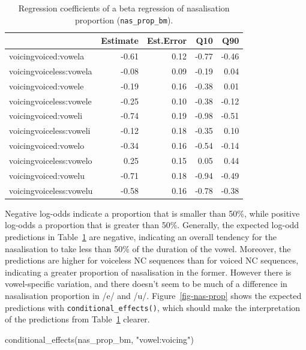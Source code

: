 \documentclass[
  authoryear,
  preprint,
  3p]{elsarticle}
\newenvironment{Shaded}{\begin{snugshade}}{\end{snugshade}}
\newcommand{\AttributeTok}[1]{\textcolor[rgb]{0.40,0.45,0.13}{#1}}
\newcommand{\ConstantTok}[1]{\textcolor[rgb]{0.56,0.35,0.01}{#1}}
\newcommand{\DecValTok}[1]{\textcolor[rgb]{0.68,0.00,0.00}{#1}}
\newcommand{\FunctionTok}[1]{\textcolor[rgb]{0.28,0.35,0.67}{#1}}
\newcommand{\NormalTok}[1]{\textcolor[rgb]{0.00,0.23,0.31}{#1}}
\newcommand{\OtherTok}[1]{\textcolor[rgb]{0.00,0.23,0.31}{#1}}
\newcommand{\SpecialCharTok}[1]{\textcolor[rgb]{0.37,0.37,0.37}{#1}}
\newcommand{\StringTok}[1]{\textcolor[rgb]{0.13,0.47,0.30}{#1}}
\providecommand{\DIFadd}[1]{{\protect\color{blue}\uwave{#1}}} %
\providecommand{\DIFaddbegin}{} %
\providecommand{\DIFaddend}{} %
\newcommand{\DIFaddincludegraphics}[2][]{{\color{blue}\fbox{\DIFOincludegraphics[#1]{#2}}}} %
\DeclareRobustCommand{\DIFaddbegin}{\DIFOaddbegin \let\includegraphics\DIFaddincludegraphics} %
\DeclareRobustCommand{\DIFaddend}{\DIFOaddend \let\includegraphics\DIFOincludegraphics} %
\begin{document}
\begin{longtable}[]{@{}lrrrr@{}}

\caption{\label{tbl-nas-prop-fixef}Regression coefficients of a beta
regression of nasalisation proportion (\texttt{nas\_prop\_bm}).}

\tabularnewline

\toprule\noalign{}
& Estimate & Est.Error & Q10 & Q90 \\
\midrule\noalign{}
\endhead
\bottomrule\noalign{}
\endlastfoot
voicingvoiced:vowela & -0.61 & 0.12 & -0.77 & -0.46 \\
voicingvoiceless:vowela & -0.08 & 0.09 & -0.19 & 0.04 \\
voicingvoiced:vowele & -0.19 & 0.16 & -0.38 & 0.01 \\
voicingvoiceless:vowele & -0.25 & 0.10 & -0.38 & -0.12 \\
voicingvoiced:voweli & -0.74 & 0.19 & -0.98 & -0.51 \\
voicingvoiceless:voweli & -0.12 & 0.18 & -0.35 & 0.10 \\
voicingvoiced:vowelo & -0.34 & 0.16 & -0.54 & -0.14 \\
voicingvoiceless:vowelo & 0.25 & 0.15 & 0.05 & 0.44 \\
voicingvoiced:vowelu & -0.71 & 0.18 & -0.94 & -0.49 \\
voicingvoiceless:vowelu & -0.58 & 0.16 & -0.78 & -0.38 \\

\end{longtable}

Negative log-odds indicate a proportion that is smaller than 50\%, while
positive log-odds a proportion that is greater than 50\%. Generally, the
expected log-odd predictions in Table~\ref{tbl-nas-prop-fixef} are
negative, indicating an overall tendency for the nasalisation to take
less than 50\% of the duration of the vowel. Moreover, the predictions
are higher for voiceless NC sequences than for voiced NC sequences,
indicating a greater proportion of nasalisation in the former. However
there is vowel-specific variation, and there doesn't seem to be much of
a difference in nasalisation proportion in /e/ and /u/.
Figure~\ref{fig-nas-prop} shows the expected predictions with
\texttt{conditional\_effects()}, which should make the interpretation of
the predictions from Table~\ref{tbl-nas-prop-fixef} clearer.

\begin{Shaded}
\begin{Highlighting}[]
\DIFaddbegin \DIFadd{\NormalTok{ce }\OtherTok{\textless{}{-}} }\DIFaddend \FunctionTok{conditional\_effects}\NormalTok{(nas\_prop\_bm, }\StringTok{"vowel:voicing"}\NormalTok{)}
\DIFaddbegin \DIFadd{\NormalTok{p }\OtherTok{\textless{}{-}} \FunctionTok{plot}\NormalTok{(ce, }\AttributeTok{plot =} \ConstantTok{FALSE}\NormalTok{)[[}\DecValTok{1}\NormalTok{]]}
\NormalTok{p }\SpecialCharTok{+}
  \FunctionTok{labs}\NormalTok{(}
    \AttributeTok{y =} \StringTok{"Proportion of nasality"}
\NormalTok{  )}
}\DIFaddend \end{Highlighting}
\end{Shaded}
\end{document}
